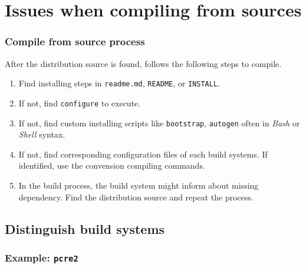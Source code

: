 \section{Issues when compiling from sources}

\begin{frame}
    \frametitle{Compile from source process}

    After the distribution source is found, follows the following steps to compile.

    \begin{enumerate}
        \item Find installing steps in \alert{\texttt{readme.md}}, \alert{\texttt{README}}, or \alert{\texttt{INSTALL}}.
        \item If not, find \texttt{configure} to execute.
        \item If not, find custom installing scripts like \alert{\texttt{bootstrap}}, \alert{\texttt{autogen}} often in \textit{Bash} or \textit{Shell} syntax.
        \item If not, find corresponding configuration files of each build systems. If identified, use the convension compiling commands.
        \item In the build process, the build system might inform about missing dependency. Find the distribution source and repeat the process.
    \end{enumerate}
\end{frame}

\subsection{Distinguish build systems}

\begin{frame}
    \frametitle{Example: \texttt{pcre2}}

    \begin{center}
    \end{center}
\end{frame}


